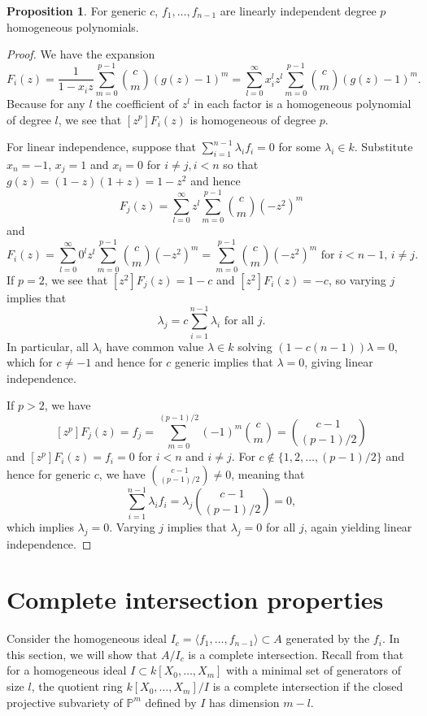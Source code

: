 \documentclass{amsart}
\numberwithin{equation}{section}
\theoremstyle{definition}
\newtheorem{proposition}[theorem]{Proposition}
\newcommand{\PP}{\mathbb{P}}
\begin{document}
\begin{proposition}\label{prop:linind} 
For generic $c$, $f_1, \ldots, f_{n - 1}$ are linearly independent degree $p$ homogeneous polynomials.
\end{proposition} 
\begin{proof} 
We have the expansion
\[
F_i(z)=\frac{1}{1-x_iz}\sum_{m=0}^{p-1} \binom{c}{m} (g(z)-1)^m=\sum_{l=0}^\infty x_i^lz^l\sum_{m=0}^{p-1} \binom{c}{m} (g(z)-1)^m.
\]
Because for any $l$ the coefficient of $z^l$ in each factor is a homogeneous polynomial of degree $l$, we see that $[z^p]F_i(z)$ is homogeneous of degree $p$.

For linear independence, suppose that $\sum_{i=1}^{n-1} \lambda_if_i=0$ for some $\lambda_i \in k$.  Substitute $x_{n} = -1$, $x_j=1$ and $x_i=0$ for $i \ne j,i < n$ so that $g(z)=(1-z)(1+z)=1-z^2$ and hence
\[
F_j(z)=\sum_{l=0}^\infty z^l\sum_{m=0}^{p-1} \binom{c}{m} (-z^2)^m
\]
and 
\[
F_i(z)=\sum_{l=0}^\infty 0^lz^l\sum_{m=0}^{p-1} \binom{c}{m} (-z^2)^m=\sum_{m=0}^{p-1} \binom{c}{m} (-z^2)^m \text{ for $i < n - 1$, $i \neq j$}.
\]
If $p = 2$, we see that $[z^2]F_j(z)=1-c$ and $[z^2]F_i(z)=-c$, so varying $j$ implies that
\[
\lambda_j = c\sum_{i=1}^{n-1} \lambda_i \text{ for all }j.
\]
In particular, all $\lambda_i$ have common value $\lambda \in k$ solving $(1-c(n-1))\lambda = 0$, which for $c \ne -1$ and hence for $c$ generic implies that $\lambda = 0$, giving linear independence. 

If $p > 2$, we have 
\[
[z^p]F_j(z)=f_j=\sum_{m=0}^{(p-1)/2} (-1)^m\binom{c}{m}=\binom{c-1}{(p-1)/2}
\]
and $[z^p]F_i(z)=f_i=0$ for $i < n$ and $i \neq j$. For $c \notin \{1,2,\dots,(p-1)/2\}$ and hence for generic $c$, we have $\binom{c-1}{(p-1)/2} \ne 0$, meaning that 
\[
\sum_{i=1}^{n-1} \lambda_if_i = \lambda_j\binom{c-1}{(p-1)/2}=0,
\]
which implies $\lambda_j=0$.  Varying $j$ implies that $\lambda_j=0$ for all $j$, again yielding linear independence.
\end{proof}

\section{Complete intersection properties}

Consider the homogeneous ideal $I_c = \langle f_1, \ldots, f_{n - 1} \rangle \subset A$ generated by the $f_i$.  In this section, we will show that $A/I_c$ is a complete intersection.  Recall from \cite[Example 11.8]{Har} that for a homogeneous ideal $I \subset k[X_0,\dots,X_m]$ with a minimal set of generators of size $l$, the quotient ring $k[X_0, \ldots, X_m]/I$ is a complete intersection if the closed projective subvariety of $\PP^m$ defined by $I$ has dimension $m - l$.
\end{document}
